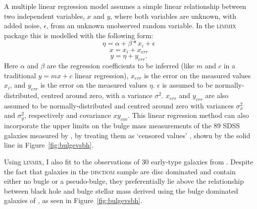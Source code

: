 {A multiple linear regression model assumes a simple linear relationship between two independent variables, $x$ and $y$, where both variables are unknown, with added noise, $\epsilon$, from an unknown unobserved random variable. In the \textsc{limmix} package this is modelled with the following form:
\begin{equation}\label{2dlinemodel}
\eta = \alpha + \beta * x_i + \epsilon
\end{equation}
\begin{equation}\label{2dlinemodel2}
x = x_i + x_{err}
\end{equation}
\begin{equation}\label{2dlinemodel3}
y = \eta + y_{err}.
\end{equation}
Here $\alpha$ and $\beta$ are the regression coefficients to be inferred (like $m$ and $c$ in a traditional $y=mx + c$ linear regression), $x_{err}$ is the error on the measured values $x_i$, and $y_{err}$ is the error on the measured values $\eta$. $\epsilon$ is assumed to be normally-distributed, centred around zero, with a variance $\sigma^2$. $x_{err}$ and $y_{err}$ are also assumed to be normally-distributed and centred around zero with variances $\sigma_x^2$ and $\sigma_y^2$, respectively and covariance $xy_{cov}$. This linear regression method can also incorporate the upper limits on the bulge mass measurements of the 89 SDSS galaxies measured by \citet[][see Section \ref{sec:galmass}]{simard11},  by treating them as `censored values' \citep[see Section 7.2 of][]{kelly07}, shown by the solid line in Figure~\ref{fig:bulgevsbh}.

Using \textsc{linmix}, I also fit to the observations of 30 early-type galaxies from \citet{haringrix04}. Despite the fact that galaxies in the \textsc{discdom} sample are disc dominated and contain either no bugle or a pseudo-bulge, they preferentially lie above the relationship between black hole and bulge stellar mass derived using the bulge dominated galaxies of \citet{haringrix04}, as seen in Figure~\ref{fig:bulgevsbh}. 

}
